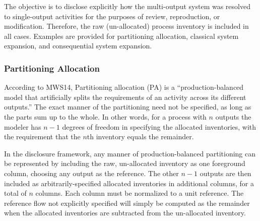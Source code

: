 The objective is to disclose explicitly how the multi-output system was resolved to single-output activities for the purposes of review, reproduction, or modification.  Therefore, the raw (un-allocated) process inventory is included in all cases.  Examples are provided for partitioning allocation, classical system expansion, and consequential system expansion.

\subsubsection{Partitioning Allocation}

According to MWS14, Partitioning allocation (PA) is a ``production-balanced model that artificially splits the requirements of an activity across its different outputs.''  The exact manner of the partitioning need not be specified, as long as the parts sum up to the whole.  In other words, for a process with $n$ outputs the modeler has $n-1$ degrees of freedom in specifying the allocated inventories, with the requirement that the $n$th inventory equals the remainder.

In the disclosure framework, any manner of production-balanced partitioning can be represented by including the raw, un-allocated inventory as one foreground column, choosing any output as the reference.  The other $n-1$ outputs are then included as arbitrarily-specified allocated inventories in additional columns, for a total of $n$ columns.  Each column must be normalized to a unit reference.  The reference flow not explicitly specified will simply be computed as the remainder when the allocated inventories are subtracted from the un-allocated inventory.

